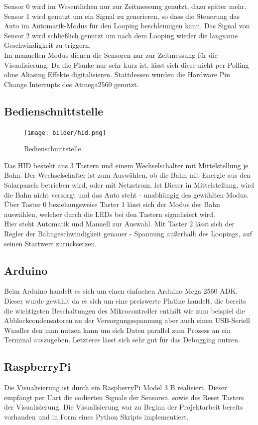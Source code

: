 \documentclass[a4paper, 11pt]{scrartcl}
\begin{document}
		Sensor 0 wird im Wesentlichen nur zur Zeitmessung genutzt, dazu später mehr.
		Sensor 1 wird genutzt um ein Signal zu generieren, so dass die Steuerung das Auto im Automatik-Modus für den Looping beschleunigen kann. 		Das Signal von Sensor 2 wird schließlich genutzt um nach dem Looping wieder die langsame Geschwindigkeit zu triggern.\\
		Im manuellen Modus dienen die Sensoren nur zur Zeitmessung für die Visualisierung.
		Da die Flanke nur sehr kurz ist, lässt sich diese nicht per Polling ohne Aliasing Effekte digitalisieren. Stattdessen wurden die Hardware 		Pin Change Interrupts des Atmega2560 genutzt.
	\subsection{Bedienschnittstelle}
		\begin{figure}[h]
			\centering
			\texttt{[image: bilder/hid.png]}
			\caption{Bedienschnittstelle}
			\label{img:hid}
		\end{figure}
		Das HID besteht aus 3 Tastern und einem Wechselschalter mit Mittelstellung je Bahn.
		Der Wechselschalter ist zum Auswählen, ob die Bahn mit Energie aus den Solarpanels betrieben wird, oder mit Netzstrom. Ist Dieser in Mittelstellung, wird die Bahn nicht versorgt und das Auto steht - unabhängig des gewählten Modus.
		Über Taster 0 beziehungsweise Taster 1 lässt sich der Modus der Bahn auswählen, welcher durch die LEDs bei den Tastern signalisiert wird. \\Hier steht Automatik und Manuell zur Auswahl.
		Mit Taster 2 lässt sich der Regler der Bahngeschwindigkeit genauer -  Spannung außerhalb des Loopings, auf seinen Startwert zurücksetzen.
	\subsection{Arduino}
		Beim Arduino handelt es sich um einen einfachen Arduino Mega 2560 ADK.\\
		Dieser wurde gewählt da es sich um eine preiswerte Platine handelt, die bereits die wichtigsten Beschaltungen des Mikrocontroller enthält wie zum beispiel die Abblockcondensatoren an der Versorgungsspannung aber auch einen USB-Seriell Wandler den man nutzen kann um sich Daten parallel zum Prozess an ein Terminal auszugeben.
		Letzteres lässt sich sehr gut für das Debugging nutzen.
	\subsection{RaspberryPi}
		Die Visualisierung ist durch ein RaspberryPi Model 3 B realisiert. Dieser empfängt per Uart die codierten Signale der Sensoren, sowie des Reset Tasters der Visualisierung.
		Die Visualisierung war zu Beginn der Projektarbeit bereits vorhanden und in Form eines Python Skripts implementiert.
\end{document}
